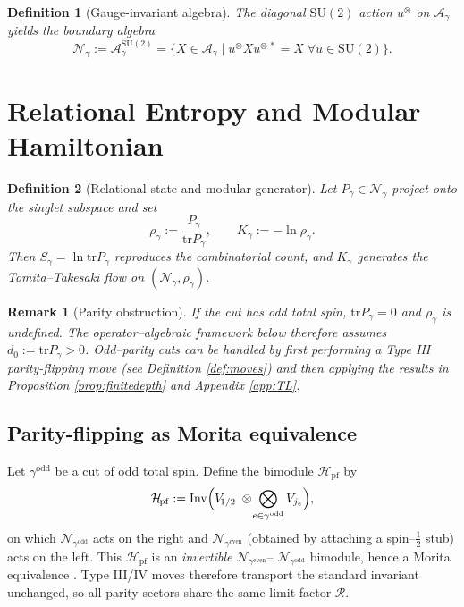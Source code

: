 \documentclass[11pt]{article}
\newtheorem{definition}{Definition}[section]
\newtheorem{remark}{Remark}[section]
\begin{document}
\begin{definition}[Gauge-invariant algebra]
The diagonal $\mathrm{SU}(2)$ action $u^{\otimes}$ on
$\mathcal A_\gamma$ yields the \emph{boundary algebra}
\[
  \mathcal N_{\gamma} := 
  \mathcal A_{\gamma}^{\mathrm{SU}(2)}
  =
  \{X\in\mathcal A_{\gamma}\mid
    u^{\otimes} X u^{\otimes\,*}=X\;\forall u\in \mathrm{SU}(2)\}.
\]
\end{definition}

\section{Relational Entropy and Modular Hamiltonian}

\begin{definition}[Relational state and modular generator]
Let $P_{\gamma}\in\mathcal N_{\gamma}$ project onto the singlet subspace and set
\[
  \rho_{\gamma}:=\frac{P_{\gamma}}{\mathrm{tr}P_{\gamma}},\qquad
  K_{\gamma}:=-\ln\rho_{\gamma}.
\]
Then $S_{\gamma}=\ln\mathrm{tr}P_{\gamma}$ reproduces the combinatorial count,
and $K_{\gamma}$ generates the Tomita–Takesaki flow on
$(\mathcal N_{\gamma},\rho_{\gamma})$.
\end{definition}

\begin{remark}[Parity obstruction]\label{rem:parity}
If the cut has \emph{odd} total spin, $\mathrm{tr}P_{\gamma}=0$ and
$\rho_{\gamma}$ is undefined.
The operator–algebraic framework below therefore assumes
$d_0:=\mathrm{tr}P_{\gamma}>0$.
Odd–parity cuts can be handled by first performing a Type III
parity-flipping move (see Definition \ref{def:moves}) and then applying the
results in Proposition \ref{prop:finitedepth} and Appendix \ref{app:TL}.
\end{remark}


\subsection*{Parity-flipping as Morita equivalence}

Let $\gamma^{\mathrm{odd}}$ be a cut of odd total spin.
Define the bimodule $\mathcal{H}_{\!\mathrm{pf}}$ by
\[
  \mathcal{H}_{\!\mathrm{pf}}
  :=\operatorname{Inv}\Bigl(
      V_{\!1/2}\;\otimes\!
      \bigotimes_{e\in\gamma^{\mathrm{odd}}}V_{j_e}
    \Bigr),
\]
on which
$\mathcal N_{\gamma^{\mathrm{odd}}}$ acts on the right and
$\mathcal N_{\gamma^{\mathrm{even}}}$ (obtained by attaching a spin–$\frac12$
stub) acts on the left.  This $\mathcal H_{\!\mathrm{pf}}$ is an
\emph{invertible} $\mathcal N_{\gamma^{\mathrm{even}}}$–%
$\mathcal N_{\gamma^{\mathrm{odd}}}$ bimodule, hence a Morita equivalence
\cite[Def.~2.1]{PopaCBMS}.  Type III/IV moves therefore transport the standard
invariant unchanged, so all parity sectors share the same limit factor
$\mathcal R$.
\end{document}
